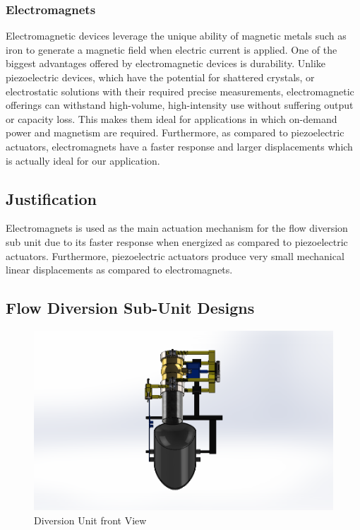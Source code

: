 \subsubsection{Electromagnets}
\par
Electromagnetic devices leverage the unique ability of magnetic metals such as iron to generate a magnetic field when electric current is applied. One of the biggest advantages offered by electromagnetic devices is durability. Unlike piezoelectric devices, which have the potential for shattered crystals, or electrostatic solutions with their required precise measurements, electromagnetic offerings can withstand high-volume, high-intensity use without suffering output or capacity loss. This makes them ideal for applications in which on-demand power and magnetism are required. Furthermore, as compared to piezoelectric actuators, electromagnets have a faster response and larger displacements which is actually ideal for our application.
\subsection{Justification}
\par
Electromagnets is used as the main actuation mechanism for the flow diversion sub unit due to its faster response when energized as compared to piezoelectric actuators. Furthermore, piezoelectric actuators produce very small mechanical linear displacements as compared to electromagnets.
\subsection{Flow Diversion Sub-Unit Designs}

\begin{figure}[ht]
\includegraphics[width=0.9\linewidth]{Figures/DiversionUnit_front.png}
\centering
\caption{Diversion Unit front View }
\label{fig:DiversionUnit_front.}
\end{figure}


